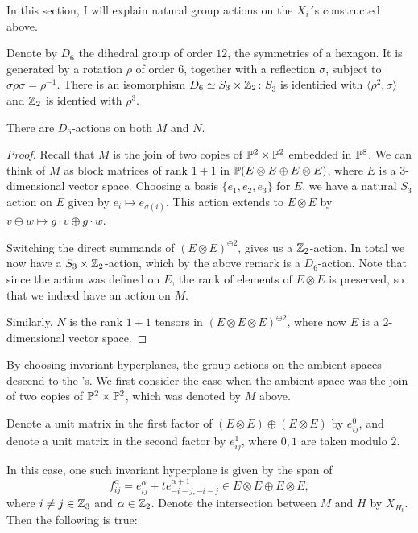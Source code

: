 In this section, I will explain natural group actions on the $X_i$´s constructed above.

Denote by $D_6$ the dihedral group of order $12$, the symmetries of a hexagon. It is generated by a rotation $\rho$ of order $6$, together with a reflection $\sigma$, subject to $\sigma \rho \sigma = \rho^{-1}$. There is an isomorphism $D_6 \simeq S_3 \times \Z_2$: $S_3$ is identified with $\langle \rho^2, \sigma \rangle$ and $\Z_2$ is identied with $\rho^3$.

\begin{lemma}
There are $D_6$-actions on both $M$ and $N$.
\end{lemma}
\begin{proof}
Recall that $M$ is the join of two copies of $\P^2 \times \P^2$ embedded in $\P^8$. We can think of $M$ as block matrices of rank $1+1$ in $\P(E \otimes E \oplus E \otimes E)$, where $E$ is a $3$-dimensional vector space. Choosing a basis $\{e_1,e_2,e_3\}$ for $E$, we have a natural $S_3$ action on $E$ given by $e_i \mapsto e_{\sigma(i)}$. This action extends to $E \otimes E$ by $v \oplus w \mapsto g \cdot v \oplus g \cdot w$.  

Switching the direct summands of ${\left(E \otimes E\right)}^{\oplus 2}$, gives us a $\Z_2$-action. In total we now have a $S_3 \times \Z_2$-action, which by the above remark is a $D_6$-action. Note that since the action was defined on $E$, the rank of elements of $E \otimes E$ is preserved, so that we indeed have an action on $M$.

Similarly, $N$ is the rank $1+1$ tensors in ${\left(E \otimes E \otimes E \right)}^{\oplus 2}$, where now $E$ is a $2$-dimensional vector space. 
\end{proof}


By choosing invariant hyperplanes, the group actions on the ambient spaces descend to the \CY's. We first consider the case when the ambient space was the join of two copies of $\P^2 \times \P^2$, which was denoted by $M$ above.

Denote a unit matrix in the first factor of $(E \otimes E) \oplus (E \otimes E)$ by $e_{ij}^0$, and denote a unit matrix in the second factor by $e_{ij}^1$, where $0,1$ are taken modulo $2$. 

In this case, one such invariant hyperplane is given by the span of
$$
f_{ij}^\alpha = e_{ij}^\alpha + t e_{-i-j,-i-j}^{\alpha+1} \in E\otimes E \oplus E \otimes E,
$$
where $i \neq j \in \Z_3$ and $\alpha \in \Z_2$. Denote the intersection between $M$ and $H$ by $X_{H_t}$. Then the following is true:

